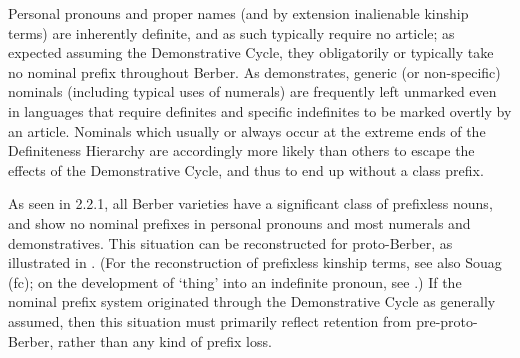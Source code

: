 \documentclass[output=paper]{langscibook}
\begin{document}
\begin{styleStandarduser}
Personal pronouns and proper names (and by extension inalienable kinship terms) are inherently definite, and as such typically require no article; as expected assuming the Demonstrative Cycle, they obligatorily or typically take no nominal prefix throughout Berber. As \citet{Greenberg1978} demonstrates, generic (or non-specific) nominals (including typical uses of numerals) are frequently left unmarked even in languages that require definites and specific indefinites to be marked overtly by an article. Nominals which usually or always occur at the extreme ends of the Definiteness Hierarchy are accordingly more likely than others to escape the effects of the Demonstrative Cycle, and thus to end up without a class prefix.
\end{styleStandarduser}

\begin{styleStandarduser}
As seen in 2.2.1, all Berber varieties have a significant class of prefixless nouns, and show no nominal prefixes in personal pronouns and most numerals and demonstratives. This situation can be reconstructed for proto-Berber, as illustrated in . (For the reconstruction of prefixless kinship terms, see also Souag (fc); on the development of ‘thing’ into an indefinite pronoun, see \citet{Souag2018}.)  If the nominal prefix system originated through the Demonstrative Cycle as generally assumed, then this situation must primarily reflect retention from pre-proto-Berber, rather than any kind of prefix loss.
\end{styleStandarduser}

\begin{styleLangsciTableHeading}%
\begin{table}
\caption{Some nouns which are reconstructible for proto-Berber with no prefix.}
\label{tab:key:10}
\end{table}\end{styleLangsciTableHeading}
\end{document}
